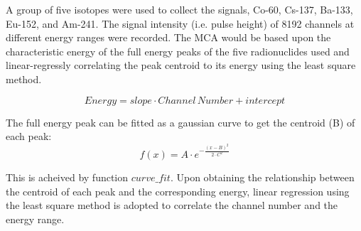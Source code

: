 A group of five isotopes were used to collect the signals, Co-60, Cs-137, Ba-133, Eu-152, and Am-241. The signal intensity (i.e. pulse height) of 8192 channels at different energy ranges were recorded. The MCA would be based upon the characteristic energy of the full energy peaks of the five radionuclides used and linear-regressly correlating the peak centroid to its energy using the least square method.


\[Energy=slope\cdot Channel\,Number + intercept\]

The full energy peak can be fitted as a gaussian curve to get the centroid (B) of each peak:
\[f\left( x \right) = A \cdot {e^{ - \frac{{{{\left( {x - B} \right)}^2}}}{{2 \cdot {C^2}}}}}\]

This is acheived by function $curve\_fit$. Upon obtaining the relationship between the centroid of each peak and the corresponding energy, linear regression using the least square method is adopted to correlate the channel number and the energy range.


